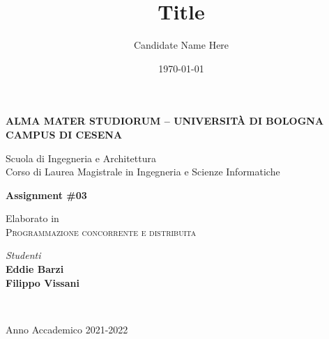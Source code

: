 \title{Title}
\author{Candidate Name Here}
\date{\today}

\begin{titlepage}
	\begin{center}
		
		\large
		\textbf{ALMA MATER STUDIORUM -- UNIVERSITÀ DI BOLOGNA \\ CAMPUS DI CESENA}
		\\
		\noindent\hrulefill
		\vspace{0.4cm}
		
		\Large
		Scuola di Ingegneria e Architettura \\
		Corso di Laurea Magistrale in Ingegneria e Scienze Informatiche
		
		\Huge
		\vspace{4cm}
		\textbf{Assignment \#03}
		
		\large
		\vspace{1cm}
		Elaborato in 
		\\
		\textsc{Programmazione concorrente e distribuita}
		
		\vspace{5.5cm}
		\begin{minipage}[t]{0.64\textwidth}
			\begin{flushleft}
			\end{flushleft}
		\end{minipage}
		\begin{minipage}[t]{0.34\textwidth}
			\begin{flushright}
				\textit{Studenti} 
				\\ 
				\textbf{Eddie Barzi}
				\\ 
				\textbf{Filippo Vissani}
			\end{flushright}
		\end{minipage}\\
		
		\vfill
		\noindent\hrulefill
		\vspace{0.3cm}
		\Large

		Anno Accademico 2021-2022
	\end{center}
\end{titlepage}
\restoregeometry
